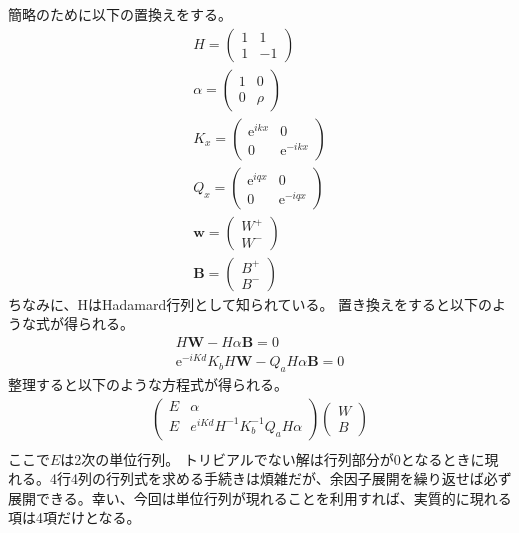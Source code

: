 \documentclass[a4paper, lualatex]{bxjsarticle}
\begin{document}
    簡略のために以下の置換えをする。
    \begin{align}
     H=\begin{pmatrix} 1 & 1 \\ 1 & -1 \end{pmatrix}\nonumber\\
        \alpha =\begin{pmatrix} 1 & 0 \\ 0 & \rho  \end{pmatrix}\nonumber\\
        K_x=\begin{pmatrix} \mathrm{e}^{ikx} & 0 \\ 0 &  \mathrm{e}^{-ikx} \end{pmatrix}\nonumber\\
        Q_x=\begin{pmatrix} \mathrm{e}^{iqx} & 0 \\ 0 &  \mathrm{e}^{-iqx} \end{pmatrix}\nonumber\\
        \mathbf{w} = \begin{pmatrix} W^{+} \\ W^{-} \end{pmatrix}\nonumber\\
        \mathbf{B} = \begin{pmatrix} B^{+} \\ B^{-} \end{pmatrix}
    \end{align}
    ちなみに、HはHadamard行列として知られている。
    置き換えをすると以下のような式が得られる。
    \begin{align}
     H \mathbf{W} - H \alpha \mathbf{B} = 0\nonumber\\
        \mathrm{e}^{-iKd} K_b H \mathbf{W} - Q_a H \alpha \mathbf{B} = 0
    \end{align}
    整理すると以下のような方程式が得られる。
    \begin{align}
     \begin{pmatrix} E & \alpha  \\ E & { e }^{ iKd }H^{ -1 }K_{ b }^{ -1 } Q_{ a }H\alpha  \end{pmatrix}\begin{pmatrix} { W } \\ { B } \end{pmatrix}\nonumber\\
    \end{align}
    ここで$E$は2次の単位行列。
    トリビアルでない解は行列部分が0となるときに現れる。4行4列の行列式を求める手続きは煩雑だが、余因子展開を繰り返せば必ず展開できる。幸い、今回は単位行列が現れることを利用すれば、実質的に現れる項は4項だけとなる。
\end{document}
